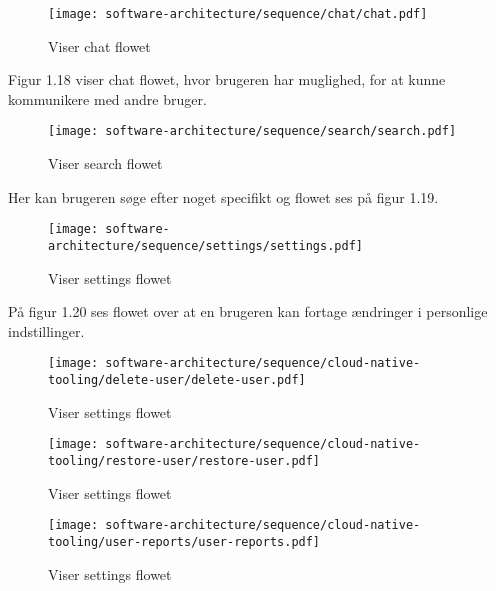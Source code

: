 \begin{figure}[ht]
    \centering
\texttt{[image: software-architecture/sequence/chat/chat.pdf]}
\caption{Viser chat flowet}
\label{fig:figure4}
\end{figure}
Figur 1.18 viser chat flowet, hvor brugeren har muglighed, for at kunne kommunikere med andre bruger.
\newpage
\begin{figure}[ht]
    \centering
\texttt{[image: software-architecture/sequence/search/search.pdf]}
\caption{Viser search flowet}
\label{fig:figure4}
\end{figure}
Her kan brugeren søge efter noget specifikt og flowet ses på figur 1.19.

\begin{figure}[ht]
    \centering
\texttt{[image: software-architecture/sequence/settings/settings.pdf]}
\caption{Viser settings flowet}
\label{fig:figure4}
\end{figure}
På figur 1.20 ses flowet over at en brugeren kan fortage ændringer i personlige indstillinger. 

\begin{figure}[ht]
    \centering
\texttt{[image: software-architecture/sequence/cloud-native-tooling/delete-user/delete-user.pdf]}
\caption{Viser settings flowet}
\label{fig:figure4}
\end{figure}

\begin{figure}[ht]
    \centering
\texttt{[image: software-architecture/sequence/cloud-native-tooling/restore-user/restore-user.pdf]}
\caption{Viser settings flowet}
\label{fig:figure4}
\end{figure}

\begin{figure}[ht]
    \centering
\texttt{[image: software-architecture/sequence/cloud-native-tooling/user-reports/user-reports.pdf]}
\caption{Viser settings flowet}
\label{fig:figure4}
\end{figure}